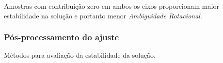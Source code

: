 Amostras com contribuição zero em ambos os eixos proporcionam maior 
estabilidade na solução e portanto menor \textit{Ambiguidade Rotacional}. 

\subsubsection{Pós-processamento do ajuste}
Métodos para avaliação da estabilidade da solução.

 
% 
%

